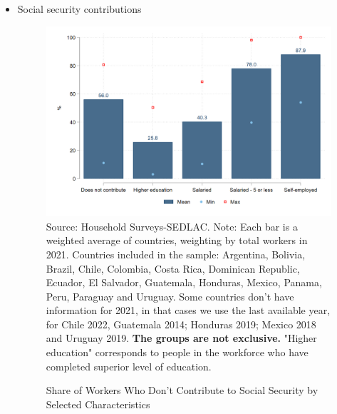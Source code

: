 \documentclass[english]{article}
\begin{document}
\begin{itemize}
        
 \item Social security contributions
    \begin{itemize}
        \begin{figure}[!htb]
        \justifying
        \caption{Share of Workers Who Don't Contribute to Social Security by Selected Characteristics}     
        \includegraphics[scale=.3]{latex/figures/Snapshot/Social security contributions.png}
        \label{fig:SScontributions}
        \footnotesize{Source: Household Surveys-SEDLAC.}
        \footnotesize{Note: Each bar is a weighted average of countries, weighting by total workers in 2021. Countries included in the sample: Argentina, Bolivia, Brazil, Chile, Colombia, Costa Rica, Dominican Republic, Ecuador, El Salvador, Guatemala, Honduras, Mexico, Panama, Peru, Paraguay and Uruguay. Some countries don’t have information for 2021, in that cases we use the last available year, for Chile 2022, Guatemala 2014; Honduras 2019; Mexico 2018 and Uruguay 2019. \textbf{The groups are not exclusive.} "Higher education" corresponds to people in the workforce who have completed superior level of education.}
        \end{figure}



\end{itemize}
\end{itemize}
\end{document}
